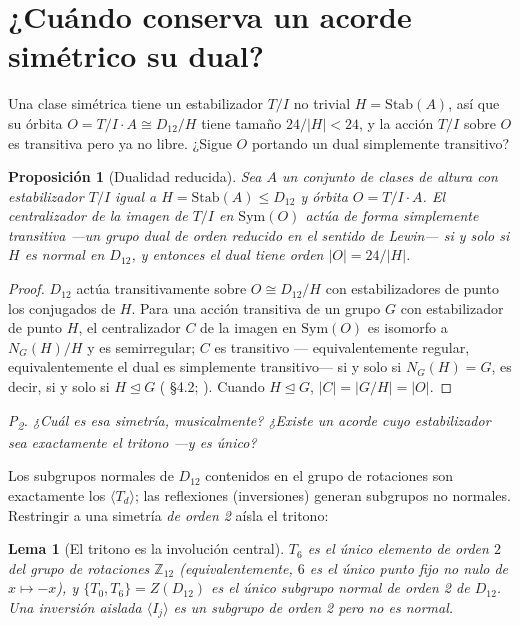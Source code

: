 \documentclass[11pt]{article}
\newtheorem{proposition}{Proposición}
\newtheorem{lemma}{Lema}
\newcommand{\Zn}[1]{\mathbb{Z}_{#1}}
\newcommand{\Dgrp}[1]{D_{#1}}
\newcommand{\Stab}{\mathrm{Stab}}
\newcommand{\question}[1]{\smallskip\noindent\textit{#1}\smallskip}
\begin{document}
\section{¿Cuándo conserva un acorde simétrico su dual?}\label{sec:char}

Una clase simétrica tiene un estabilizador $T/I$ no trivial $H=\Stab(A)$, así que su órbita
$O=T/I\cdot A\cong\Dgrp{12}/H$ tiene tamaño $24/|H|<24$, y la acción $T/I$ sobre $O$ es transitiva pero ya
no libre. ¿Sigue $O$ portando un dual simplemente transitivo?

\begin{proposition}[Dualidad reducida]\label{prop:dual}
Sea $A$ un conjunto de clases de altura con estabilizador $T/I$ igual a $H=\Stab(A)\le\Dgrp{12}$ y órbita
$O=T/I\cdot A$. El centralizador de la imagen de $T/I$ en $\mathrm{Sym}(O)$ actúa de forma simplemente
transitiva ---un grupo dual de orden reducido en el sentido de Lewin--- \emph{si y solo si $H$ es normal
en $\Dgrp{12}$}, y entonces el dual tiene orden $|O|=24/|H|$.
\end{proposition}
\begin{proof}
$\Dgrp{12}$ actúa transitivamente sobre $O\cong\Dgrp{12}/H$ con estabilizadores de punto los conjugados
de $H$. Para una acción transitiva de un grupo $G$ con estabilizador de punto $H$, el centralizador $C$
de la imagen en $\mathrm{Sym}(O)$ es isomorfo a $N_G(H)/H$ y es semirregular; $C$ es transitivo ---
equivalentemente regular, equivalentemente el dual es simplemente transitivo--- si y solo si $N_G(H)=G$,
es decir, si y solo si $H\trianglelefteq G$ (\cite{DM} \S4.2; \cite{Cam}). Cuando $H\trianglelefteq G$,
$|C|=|G/H|=|O|$.
\end{proof}

\question{P\textsubscript{2}. ¿Cuál es esa simetría, musicalmente? ¿Existe un acorde cuyo estabilizador
sea exactamente el tritono ---y es único?}

Los subgrupos normales de $\Dgrp{12}$ contenidos en el grupo de rotaciones son exactamente los
$\langle T_d\rangle$; las reflexiones (inversiones) generan subgrupos no normales. Restringir a una
simetría \emph{de orden 2} aísla el tritono:

\begin{lemma}[El tritono es la involución central]\label{lem:tritone}
$T_6$ es el único elemento de orden $2$ del grupo de rotaciones $\Zn{12}$ (equivalentemente, $6$ es el
único punto fijo no nulo de $x\mapsto -x$), y $\{T_0,T_6\}=Z(\Dgrp{12})$ es el único subgrupo normal de
orden 2 de $\Dgrp{12}$. Una inversión aislada $\langle I_j\rangle$ es un subgrupo de orden 2 pero
\emph{no} es normal.
\end{lemma}
\end{document}

